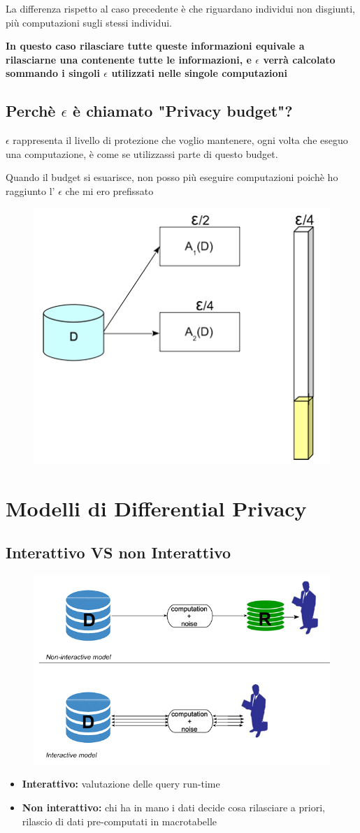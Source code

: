 \documentclass{report}
\begin{document}
\noindent La differenza rispetto al caso precedente è che riguardano individui non disgiunti, più computazioni sugli stessi individui.

\noindent \textbf{In questo caso rilasciare tutte queste informazioni equivale a rilasciarne una contenente tutte le informazioni, e $\epsilon$ verrà calcolato sommando i singoli $\epsilon$
utilizzati nelle singole computazioni}

\newpage
\section{Perchè $\epsilon$ è chiamato "Privacy budget"?}
$\epsilon$ rappresenta il livello di protezione che voglio mantenere, ogni volta che eseguo una computazione, è come se utilizzassi parte di questo budget.

\noindent Quando il budget si esuarisce, non posso più eseguire computazioni poichè ho raggiunto l' $\epsilon$ che mi ero prefissato
\begin{figure}[H]
        \centering
        \includegraphics[width=0.4\linewidth]{images/privacyBudget.png}
\end{figure}

\chapter{Modelli di Differential Privacy}

\section{Interattivo VS non Interattivo}
\begin{figure}[H]
        \centering
        \includegraphics[width=0.3\linewidth]{images/Interactive.png}
\end{figure}
\begin{itemize}
    \item \textbf{Interattivo:} valutazione delle query run-time 
    \item \textbf{Non interattivo:} chi ha in mano i dati decide cosa rilasciare a priori, rilascio di dati pre-computati in macrotabelle 
\end{itemize}
\end{document}
